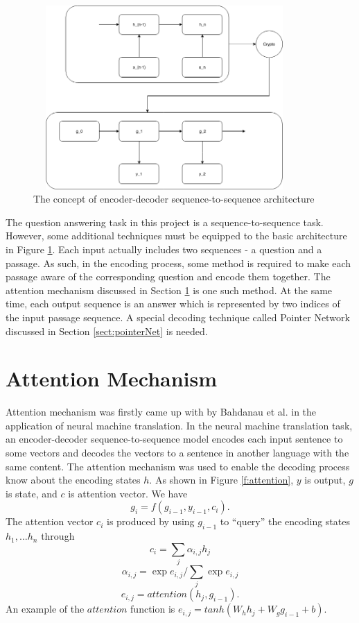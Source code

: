 \documentclass[modernstyle,12pt]{sjsuthesis}
\theoremstyle{definition}
\begin{document}
\begin{figure}[htbp]\centering
  \includegraphics[width=10cm, height=7cm]{figures/encoderDecoder.png}
  \caption{The concept of encoder-decoder sequence-to-sequence architecture}
  \label{f:encoderDecoder}
\end{figure}

The question answering task in this project is a sequence-to-sequence task. However, some additional techniques must be equipped to the basic architecture in Figure \ref{f:encoderDecoder}. Each input actually includes two sequences - a question and a passage. As such, in the encoding process, some method is required to make each passage aware of the corresponding question and encode them together. The attention mechanism discussed in Section \ref{sect:attention} is one such method. At the same time, each output sequence is an answer which is represented by two indices of the input passage sequence. A special decoding technique called Pointer Network discussed in Section \ref{sect:pointerNet} is needed.

\section{Attention Mechanism}\label{sect:attention}

Attention mechanism was firstly came up with by Bahdanau et al. \cite{bahdanau2014neural} in the application of neural machine translation. In the neural machine translation task, an encoder-decoder sequence-to-sequence model encodes each input sentence to some vectors and decodes the vectors to a sentence in another language with the same content. The attention mechanism was used to enable the decoding process know about the encoding states $h$. As shown in Figure \ref{f:attention}, $y$ is output, $g$ is state, and $c$ is attention vector. We have
$$g_i =f(g_{i-1},y_{i-1},c_i).$$
The attention vector $c_i$ is produced by using $g_{i-1}$ to ``query'' the encoding states $h_1, ... h_n$ through
$$c_i = \sum _j {\alpha _{i,j} h_j}$$
$$\alpha _{i,j} = \exp{e_{i,j}} / \sum _j {\exp{e_{i,j}}}$$
$$e_{i,j} = attention(h_j, g_{i-1}).$$
An example of the $attention$ function is $e_{i,j} = tanh(W_h h_j + W_g g_{i-1} + b)$.
\end{document}
